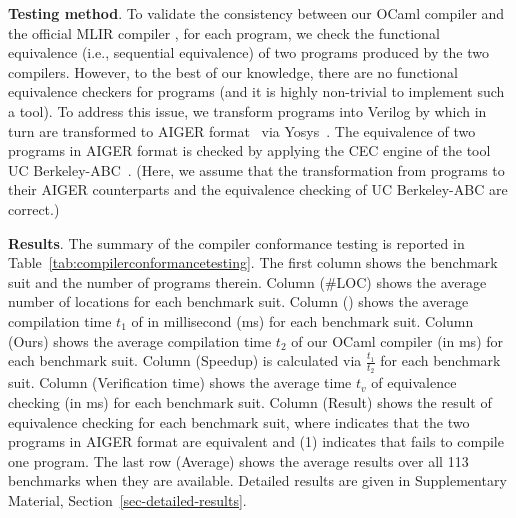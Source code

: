 \smallskip\noindent
{\bf Testing method}.
To validate the consistency between our OCaml  {\firrtl} compiler and the official MLIR  {\firrtl} compiler {\firtool},
for each  {\firrtl} program, we check the functional equivalence (i.e., sequential equivalence) of two  {\lofirrtl} programs produced by the two compilers.
However, to the best of our knowledge, there are no functional equivalence checkers for  {\lofirrtl} programs (and it is highly non-trivial to implement such a tool). To address this issue, we transform {\lofirrtl} programs into Verilog by {\firtool} which in turn are transformed  to AIGER format~\cite{aiger} via {\sf Yosys}~\cite{Yosys}.
The equivalence of two programs in AIGER format is checked
by applying the CEC engine of the tool {\sf UC Berkeley-ABC}~\cite{MishchenkoCBE06,BraytonM10}.
(Here, we assume that the transformation from  {\lofirrtl} programs to their AIGER counterparts and the equivalence checking of {\sf UC Berkeley-ABC} are correct.)


\smallskip\noindent
{\bf Results}.
The summary of the compiler conformance testing is reported in Table~\ref{tab:compilerconformancetesting}.
The first column shows the benchmark suit and the number of {\firrtl} programs therein.
Column (\#LOC) shows the average number of locations for each benchmark suit.
Column ({\firtool}) shows the average compilation time $t_1$ of {\firtool} in millisecond (ms) for each benchmark suit.
Column (Ours) shows the average compilation time $t_2$ of our OCaml {\firrtl} compiler (in ms) for each benchmark suit.
Column (Speedup) is calculated via $\frac{t_1}{t_2}$ for each benchmark suit.
Column (Verification time) shows the average time $t_v$ of equivalence checking (in ms) for each benchmark suit.
Column (Result) shows the result of equivalence checking for each benchmark suit,
where  indicates that the two programs in AIGER format are equivalent and (1) indicates
that {\firtool} fails to compile one {\firrtl} program.
The last row (Average) shows the average results over all 113 benchmarks when they are available.
Detailed results are given in Supplementary Material, Section~\ref{sec-detailed-results}. %

